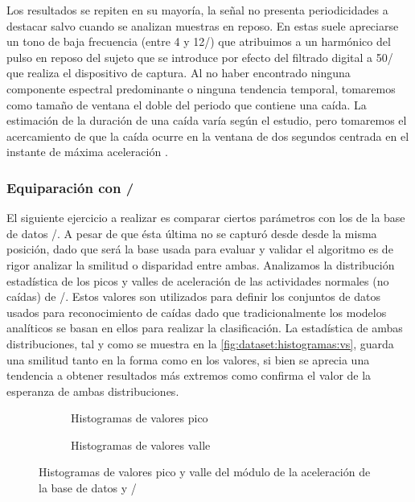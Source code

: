 Los resultados se repiten en su mayoría, la señal no presenta periodicidades a destacar salvo cuando se analizan muestras en reposo. En estas suele apreciarse un tono de baja frecuencia (entre 4 y 12\hz/) que atribuimos a un harmónico del pulso en reposo del sujeto que se introduce por efecto del filtrado digital a 50\hz/ que realiza el dispositivo de captura. Al no haber encontrado ninguna componente espectral predominante o ninguna tendencia temporal, tomaremos como tamaño de ventana el doble del periodo que contiene una caída. La estimación de la duración de una caída varía según el estudio, pero tomaremos el acercamiento de que la caída ocurre en la ventana de dos segundos centrada en el instante de máxima aceleración \cite{Sucerquia2017}. 

\subsubsection{Equiparación con \sisfall/}

El siguiente ejercicio a realizar es comparar ciertos parámetros con los de la base de datos \ifell/.  A pesar de que ésta última no se capturó desde desde la misma posición, dado que será la base usada para evaluar y validar el algoritmo es de rigor analizar la smilitud o disparidad entre ambas. Analizamos la distribución estadística de los picos y valles de aceleración de las actividades normales (no caídas) de \sisfall/. Estos valores son utilizados para definir los conjuntos de datos usados para reconocimiento de caídas dado que tradicionalmente los modelos analíticos se basan en ellos para realizar la clasificación. La estadística de ambas distribuciones, tal y como se muestra en la \autoref{fig:dataset:histogramas:vs}, guarda una smilitud tanto en la forma como en los valores, si bien se aprecia una tendencia a obtener resultados más extremos como confirma el valor de la esperanza de ambas distribuciones.

  \begin{figure}[htb!]
    \centering
    \begin{subfigure}[b]{0.45\textwidth}
      \centering
      \caption{\label{fig:dataset:histoUp} Histogramas de valores pico}
    \end{subfigure}
    \hfill
    \begin{subfigure}[b]{0.45\textwidth}
      \centering
      \caption{\label{fig:dataset:histoLow} Histogramas de valores valle}
    \end{subfigure}
    \caption{\label{fig:dataset:histogramas:vs} Histogramas de valores pico y valle del módulo de la aceleración de la base de datos y \sisfall/}
  \end{figure}




